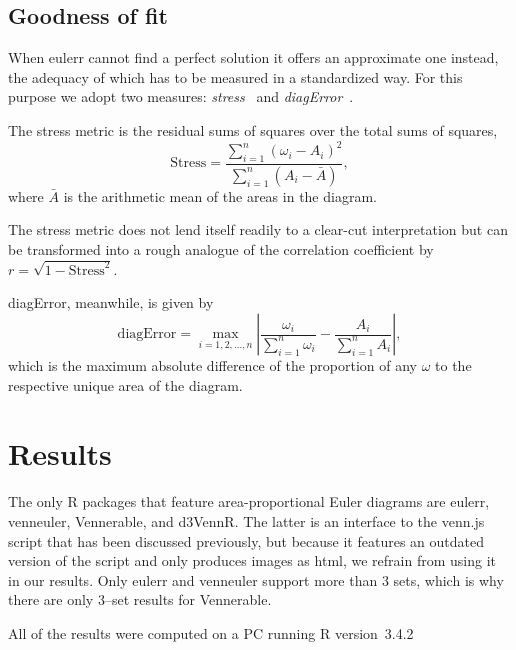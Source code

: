 \documentclass[
  oneside,
  usegeometry,
  numbers=noendperiod,
  openany,
  parskip=half
]{scrbook}\usepackage[]{graphicx}\usepackage{xcolor}
\newcommand{\pkg}[1]{{\fontseries{b}\selectfont #1}}
\begin{document}
\section{Goodness of fit}
\label{sec:gof}

When \pkg{eulerr} cannot find a perfect solution it offers an approximate one instead, the adequacy of which has to be measured in a standardized way. For this purpose we adopt two measures: \emph{stress}~\citep{wilkinson_2012} and \emph{diagError}~\citep{micallef_2014}.

The stress metric is the residual sums of squares over the total sums of squares,
\begin{equation}
\text{Stress} = \frac{\sum_{i=1}^n (\omega_i - A_i)^2}{\sum_{i=1}^n (A_i - \bar{A})},
\label{eq:stress}
\end{equation}
where $\bar{A}$ is the arithmetic mean of the areas in the diagram.

The stress metric does not lend itself readily to a clear-cut interpretation but can be transformed into a rough analogue of the correlation coefficient by $r = \sqrt{1-\text{Stress}^2}$.

diagError, meanwhile, is given by
\begin{equation}
\text{diagError} = \max_{i = 1, 2, \dots, n} \left| \frac{\omega_i}{\sum_{i=1}^n \omega_i} -
  \frac{A_i}{\sum_{i=1}^n A_i} \right|,
\label{eq:diagError}
\end{equation}
which is the maximum absolute difference of the proportion of any $\omega$ to the respective unique area of the diagram.

\chapter{Results}
\label{ch:results}

The only R packages that feature area-proportional Euler diagrams are \pkg{eulerr}, \pkg{venneuler}, \pkg{Vennerable}, and \pkg{d3VennR}. The latter is an interface to the \pkg{venn.js} script that has been discussed previously, but because it features an outdated version of the script and only produces images as html, we refrain from using it in our results. Only \pkg{eulerr} and \pkg{venneuler} support more than 3 sets, which is why there are only 3--set results for \pkg{Vennerable}.

All of the results were computed on a PC running R version~3.4.2%
\end{document}
